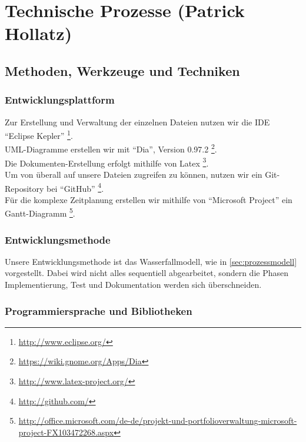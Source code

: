 \documentclass[fontsize=12pt,paper=a4,twoside]{scrartcl}
\begin{document}

\section{Technische Prozesse (Patrick Hollatz)}
\subsection{Methoden, Werkzeuge und Techniken}
\subsubsection{Entwicklungsplattform}
Zur Erstellung und Verwaltung der einzelnen Dateien nutzen wir die IDE "`Eclipse Kepler"' \footnote{\url{http://www.eclipse.org/}}.\\
UML-Diagramme erstellen wir mit "`Dia"', Version 0.97.2 \footnote{\url{https://wiki.gnome.org/Apps/Dia}}.\\
Die Dokumenten-Erstellung erfolgt mithilfe von Latex \footnote{\url{http://www.latex-project.org/}}.\\
Um von überall auf unsere Dateien zugreifen zu können, nutzen wir ein Git-Repository bei "`GitHub"' \footnote{\url{http://github.com/}}.\\
Für die komplexe Zeitplanung erstellen wir mithilfe von "`Microsoft Project"' ein Gantt-Diagramm \footnote{\url{http://office.microsoft.com/de-de/projekt-und-portfolioverwaltung-microsoft-project-FX103472268.aspx}}.

\subsubsection{Entwicklungsmethode}

Unsere Entwicklungsmethode ist das Wasserfallmodell, wie in \ref{sec:prozessmodell} vorgestellt. Dabei wird nicht alles sequentiell abgearbeitet, sondern die Phasen Implementierung, Test und Dokumentation werden sich überschneiden.

\subsubsection{Programmiersprache und Bibliotheken}
\end{document}
